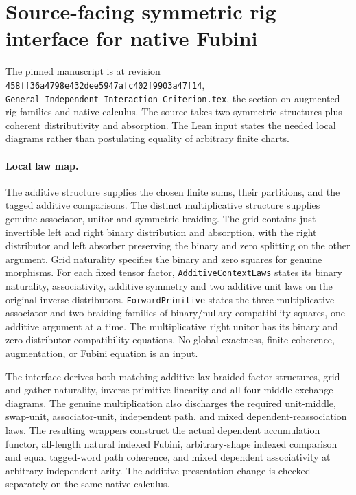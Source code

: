 \documentclass{article}
\begin{document}
\section*{Source-facing symmetric rig interface for native Fubini}
The pinned manuscript is at revision
\texttt{458ff36a4798e432dee5947afc402f9903a47f14},
\texttt{General\_Independent\_Interaction\_Criterion.tex}, the
section on augmented rig families and native calculus.
The source takes two symmetric structures plus coherent distributivity
and absorption. The Lean input states the needed local diagrams
rather than postulating equality of arbitrary finite charts.

\paragraph{Local law map.}
The additive structure supplies the chosen finite sums, their
partitions, and the tagged additive comparisons. The distinct
multiplicative structure supplies genuine associator, unitor and
symmetric braiding. The grid contains just invertible left and right
binary distribution and absorption, with the right distributor and
left absorber preserving the binary and zero splitting on the other
argument. Grid naturality specifies the binary and zero squares for
genuine morphisms. For each fixed tensor factor,
\texttt{AdditiveContextLaws} states its binary naturality,
associativity, additive symmetry and two additive unit laws on the
original inverse distributors. \texttt{ForwardPrimitive} states
the three multiplicative associator and two braiding families of
binary/nullary compatibility squares, one additive argument at a
time. The multiplicative right unitor has its binary and zero
distributor-compatibility equations. No global exactness,
finite coherence, augmentation, or Fubini equation is an input.

The interface derives both matching additive lax-braided factor
structures, grid and gather naturality, inverse primitive
linearity and all four middle-exchange diagrams. The genuine
multiplication also discharges the required unit-middle,
swap-unit, associator-unit, independent path, and mixed
dependent-reassociation laws. The resulting wrappers construct
the actual dependent accumulation functor, all-length natural
indexed Fubini, arbitrary-shape indexed comparison and equal
tagged-word path coherence, and mixed dependent associativity
at arbitrary independent arity. The additive presentation change
is checked separately on the same native calculus.
\end{document}
